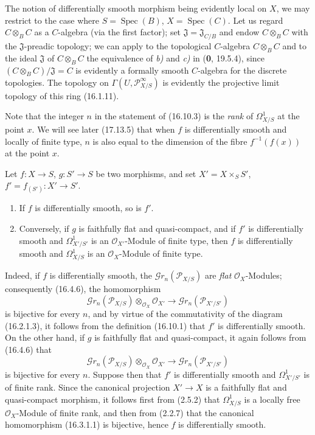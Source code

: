 The notion of differentially smooth morphism being evidently local on
$X$, we may restrict to the case where $S=\operatorname{Spec}(B)$,
$X=\operatorname{Spec}(C)$. Let us regard $C\otimes_B C$ as a $C$-algebra
(via the first factor); set $\mathfrak{J}=\mathfrak{J}_{C/B}$ and
endow $C\otimes_B C$ with the $\mathfrak{J}$-preadic topology; we can
apply to the topological $C$-algebra $C\otimes_B C$ and to the ideal
$\mathfrak{J}$ of $C\otimes_B C$ the equivalence of \emph{b)} and \emph{c)} in
(\textbf{0}, 19.5.4), since $(C\otimes_B C)/\mathfrak{J}=C$ is evidently a formally
smooth $C$-algebra for the discrete topologies. The topology on
$\Gamma(U,\mathscr{P}_{X/S}^{\infty})$ is evidently the projective limit
topology of this ring (16.1.11).

Note that the integer $n$ in the statement of (16.10.3) is the \emph{rank}
of $\varOmega_{X/S}^1$ at the point $x$. We will see later (17.13.5) that when
$f$ is differentially smooth and locally of finite type, $n$ is also
equal to the dimension of the fibre $f^{-1}(f(x))$ at the point $x$.

\begin{proposition}[16.10.4]
\label{IV.16.10.4}
Let $f:X\to S$, $g:S'\to S$ be two morphisms, and set
$X'=X\times_S S'$, $f'=f_{(S')}:X'\to S'$.
\begin{enumerate}
  \item[\textup{(i)}] If $f$ is differentially smooth, so is $f'$.
  \item[\textup{(ii)}] Conversely, if $g$ is faithfully flat and quasi-compact, and if
  $f'$ is differentially smooth and $\varOmega_{X'/S'}^1$ is an
  $\mathcal{O}_{X'}$-Module of finite type, then $f$ is differentially smooth
  and $\varOmega_{X/S}^1$ is an $\mathcal{O}_X$-Module of finite type.
\end{enumerate}
\end{proposition}

Indeed, if $f$ is differentially smooth, the
$\mathscr{G}r_n(\mathscr{P}_{X/S})$ are \emph{flat}
$\mathcal{O}_X$-Modules; consequently (16.4.6), the homomorphism
\[
  \mathscr{G}r_n(\mathscr{P}_{X/S})\otimes_{\mathcal{O}_X}\mathcal{O}_{X'}
  \longrightarrow\mathscr{G}r_n(\mathscr{P}_{X'/S'})
\]
is bijective for every $n$, and by virtue of the commutativity of the diagram
(16.2.1.3), it follows from the definition (16.10.1) that $f'$ is
differentially smooth. On the other hand, if $g$ is faithfully flat and
quasi-compact, it again follows from (16.4.6) that
\[
  \mathscr{G}r_n(\mathscr{P}_{X/S})\otimes_{\mathcal{O}_X}\mathcal{O}_{X'}
  \longrightarrow\mathscr{G}r_n(\mathscr{P}_{X'/S'})
\]
is bijective for every $n$. Suppose then that $f'$ is differentially smooth
and $\varOmega_{X'/S'}^1$ is of finite rank. Since the canonical projection
$X'\to X$ is a faithfully flat and quasi-compact morphism, it follows first
from (2.5.2) that $\varOmega_{X/S}^1$ is a locally free $\mathcal{O}_X$-Module of
finite rank, and then from (2.2.7) that the canonical homomorphism (16.3.1.1)
is bijective, hence $f$ is differentially smooth.

